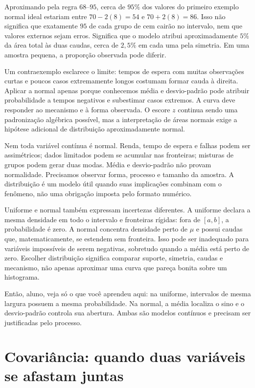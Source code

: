 Aproximando pela regra $68$--$95$, cerca de $95\%$ dos valores do primeiro exemplo normal ideal estariam entre $70-2(8)=54$ e $70+2(8)=86$. Isso não significa que exatamente $95$ de cada grupo de cem cairão no intervalo, nem que valores externos sejam erros. Significa que o modelo atribui aproximadamente $5\%$ da área total às duas caudas, cerca de $2{,}5\%$ em cada uma pela simetria. Em uma amostra pequena, a proporção observada pode diferir.

Um contraexemplo esclarece o limite: tempos de espera com muitas observações curtas e poucos casos extremamente longos costumam formar cauda à direita. Aplicar a normal apenas porque conhecemos média e desvio-padrão pode atribuir probabilidade a tempos negativos e subestimar casos extremos. A curva deve responder ao mecanismo e à forma observada. O escore $z$ continua sendo uma padronização algébrica possível, mas a interpretação de áreas normais exige a hipótese adicional de distribuição aproximadamente normal.

Nem toda variável contínua é normal. Renda, tempo de espera e falhas podem ser assimétricos; dados limitados podem se acumular nas fronteiras; misturas de grupos podem gerar duas modas. Média e desvio-padrão não provam normalidade. Precisamos observar forma, processo e tamanho da amostra. A distribuição é um modelo útil quando suas implicações combinam com o fenômeno, não uma obrigação imposta pelo formato numérico.

Uniforme e normal também expressam incertezas diferentes. A uniforme declara a mesma densidade em todo o intervalo e fronteiras rígidas: fora de $[a,b]$, a probabilidade é zero. A normal concentra densidade perto de $\mu$ e possui caudas que, matematicamente, se estendem sem fronteira. Isso pode ser inadequado para variáveis impossíveis de serem negativas, sobretudo quando a média está perto de zero. Escolher distribuição significa comparar suporte, simetria, caudas e mecanismo, não apenas aproximar uma curva que pareça bonita sobre um histograma.

\begin{SummaryBox}
Então, aluno, veja só o que você aprendeu aqui: na uniforme, intervalos de mesma largura possuem a mesma probabilidade. Na normal, a média localiza o sino e o desvio-padrão controla sua abertura. Ambas são modelos contínuos e precisam ser justificadas pelo processo.
\end{SummaryBox}

\section{Covariância: quando duas variáveis se afastam juntas}

